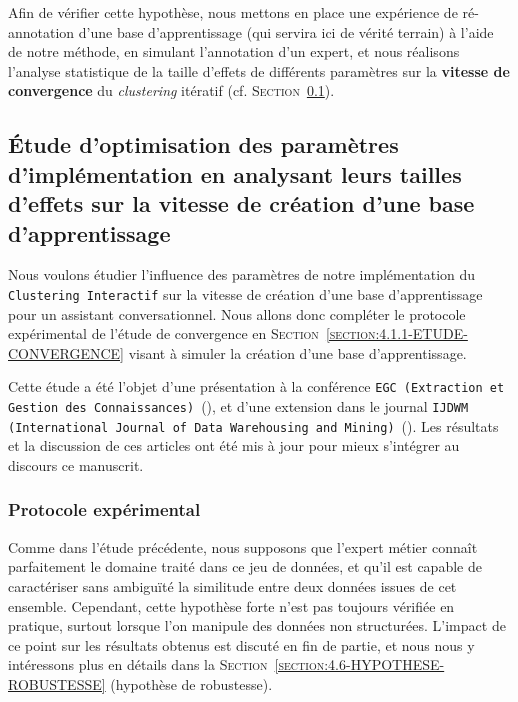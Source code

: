 	Afin de vérifier cette hypothèse, nous mettons en place une expérience de ré-annotation d'une base d'apprentissage (qui servira ici de vérité terrain) à l'aide de notre méthode, en simulant l'annotation d'un expert, et nous réalisons l'analyse statistique de la taille d'effets de différents paramètres sur la \textbf{vitesse de convergence} du \textit{clustering} itératif (cf. \textsc{Section~\ref{section:4.2.1-ETUDE-OPTIMISATION}}).
	
		
	\subsection{Étude d'optimisation des paramètres d'implémentation en analysant leurs tailles d'effets sur la vitesse de création d'une base d'apprentissage}
	\label{section:4.2.1-ETUDE-OPTIMISATION}

		Nous voulons étudier l'influence des paramètres de notre implémentation du \texttt{Clustering Interactif} sur la vitesse de création d'une base d'apprentissage pour un assistant conversationnel.
		Nous allons donc compléter le protocole expérimental de l'étude de convergence en \textsc{Section~\ref{section:4.1.1-ETUDE-CONVERGENCE}} visant à simuler la création d'une base d'apprentissage.
			
		\begin{leftBarInformation}
			Cette étude a été l'objet d'une présentation à la conférence \texttt{EGC (Extraction et Gestion des Connaissances)}~(\cite{schild-etal:2021:conception-iterative-semisupervisee}), et d'une extension dans le journal \texttt{IJDWM (International Journal of Data Warehousing and Mining)}~(\cite{schild-etal:2022:iterative-semisupervised-design}).
			Les résultats et la discussion de ces articles ont été mis à jour pour mieux s'intégrer au discours ce manuscrit.
		\end{leftBarInformation}

		\subsubsection{Protocole expérimental}
			
			\begin{leftBarWarning}
				Comme dans l'étude précédente, nous supposons que l'expert métier connaît parfaitement le domaine traité dans ce jeu de données, et qu'il est capable de caractériser sans ambiguïté la similitude entre deux données issues de cet ensemble.
				Cependant, cette hypothèse forte n'est pas toujours vérifiée en pratique, surtout lorsque l'on manipule des données non structurées.
				L'impact de ce point sur les résultats obtenus est discuté en fin de partie, et nous nous y intéressons plus en détails dans la \textsc{Section~\ref{section:4.6-HYPOTHESE-ROBUSTESSE}} (hypothèse de robustesse).
			\end{leftBarWarning}
			
